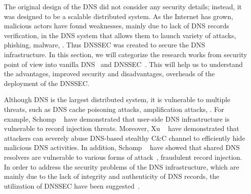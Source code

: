 The original design of the DNS did not consider any security details; instead, it was designed to be a scalable distributed system.  As the Internet has grown, malicious actors have found weaknesses, mainly due to lack of DNS records verification, in the DNS system that allows them to launch variety of attacks, \eg phishing, malware, \etc. Thus DNSSEC was created to secure the DNS infrastructure. In this section, we will categorize the research works from security point of view into vanilla DNS~ and DNSSEC~. This will help us to understand the advantages, \eg improved security and disadvantages, \eg overheads of the deployment of the DNSSEC.

Although DNS is the largest distributed system, it is vulnerable to multiple threats, such as DNS cache poisoning attacks, amplification attacks, \etc. For example, Schomp \etal~ have demonstrated that user-side DNS infrastructure is vulnerable to record injection threats. Moreover, Xu \etal~ have demonstrated that attackers can severely abuse DNS-based stealthy C\&C channel to efficiently hide malicious DNS activities. In addition, Schomp \etal ~ have showed that shared DNS resolvers are vulnerable to various forms of attack~, \eg fraudulent record injection.
In order to address the security problems of the DNS infrastructure, which are mainly due to the lack of integrity and authenticity of DNS records, the utilization of DNSSEC have been suggested~.

